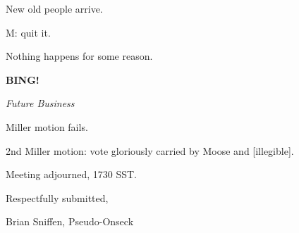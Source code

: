 \documentclass[12pt]{article}
\newcommand{\bing}{{\bf BING!} }
\newcommand{\goto}[1]{\bing \vskip 12pt \centerline{{\em{#1}}}}
\begin{document}
New old people arrive.

M: quit it.

Nothing happens for some reason.

\goto{Future Business}

Miller motion fails.

2nd Miller motion: vote gloriously carried by Moose and [illegible].

\vspace{12pt}

\noindent
Meeting adjourned, 1730 SST.

\vspace{18pt}

\centerline{Respectfully submitted,}
\centerline{Brian Sniffen, Pseudo-Onseck}
\end{document}
